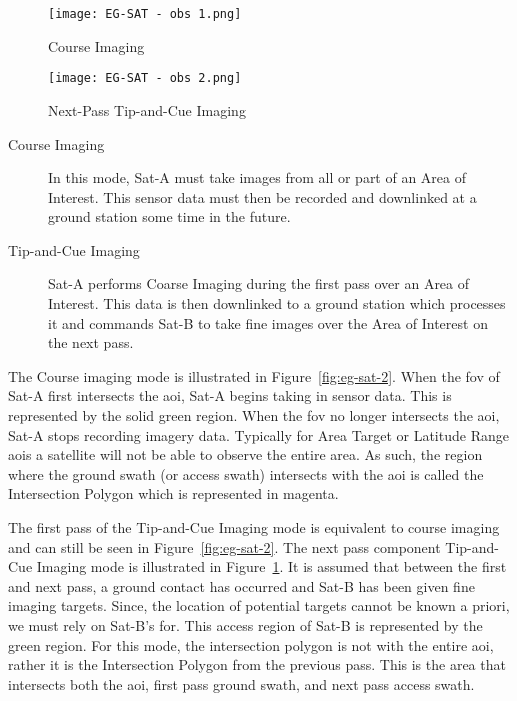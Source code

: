 \begin{figure} 
    \centering
    \begin{minipage}[c]{0.49\textwidth}
	\centering
	\texttt{[image: EG-SAT - obs 1.png]} 
	\caption{Course Imaging}
	\label{fig:eg-sat-2} 
    \end{minipage}
    \hfill
    \begin{minipage}[c]{0.49\textwidth}
	\centering
	\texttt{[image: EG-SAT - obs 2.png]} 
	\caption{Next-Pass Tip-and-Cue Imaging}
	\label{fig:eg-sat-3} 
    \end{minipage} 
\end{figure}


\begin{description} 

    \item[Course Imaging] In this mode, Sat-A must take images from all or part
	of an Area of Interest. This sensor data must then be recorded and
	downlinked at a ground station some time in the future.

    \item[Tip-and-Cue Imaging] Sat-A performs Coarse Imaging during the first
	pass over an Area of Interest. This data is then downlinked to a ground
	station which processes it and commands Sat-B to take fine images over
	the Area of Interest on the next pass.

\end{description}

The Course imaging mode is illustrated in Figure~\ref{fig:eg-sat-2}. When the
\gls{fov} of Sat-A first intersects the \gls{aoi}, Sat-A begins taking in
sensor data. This is represented by the solid green region.  When the \gls{fov}
no longer intersects the \gls{aoi}, Sat-A stops recording imagery data.
Typically for Area Target or Latitude Range \glspl{aoi} a satellite will not be
able to observe the entire area. As such, the region where the ground swath (or
access swath) intersects with the \gls{aoi} is called the Intersection Polygon
which is represented in magenta. 

The first pass of the Tip-and-Cue Imaging mode is equivalent to course imaging
and can still be seen in Figure~\ref{fig:eg-sat-2}. The next pass component
Tip-and-Cue Imaging mode is illustrated in Figure~\ref{fig:eg-sat-3}. It is
assumed that between the first and next pass, a ground contact has occurred and
Sat-B has been given fine imaging targets. Since, the location of potential
targets cannot be known a priori, we must rely on Sat-B's \gls{for}.  This
access region of Sat-B is represented by the green region. For this mode, the
intersection polygon is not with the entire \gls{aoi}, rather it is the
Intersection Polygon from the previous pass. This is the area that intersects
both the \gls{aoi}, first pass ground swath, and next pass access swath.  


